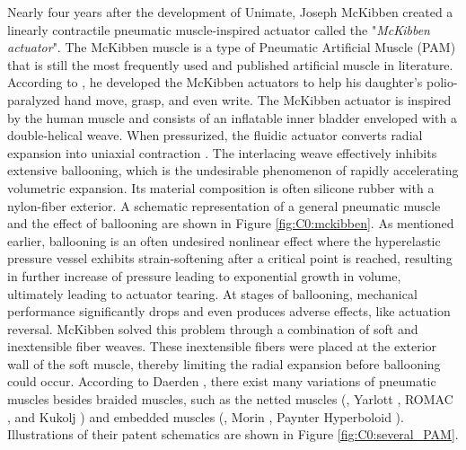 Nearly four years after the development of Unimate, Joseph McKibben created a linearly contractile pneumatic muscle-inspired actuator called the "\emph{McKibben actuator}". The McKibben muscle is a type of Pneumatic Artificial Muscle (PAM) that is still the most frequently used and published artificial muscle in literature. According to \cite{Mckibben}, he developed the McKibben actuators to help his daughter's polio-paralyzed hand move, grasp, and even write. The McKibben actuator is inspired by the human muscle and consists of an inflatable inner bladder enveloped with a double-helical weave. When pressurized, the fluidic actuator converts radial expansion into uniaxial contraction \cite{Daerden1999, Daerden2000, Schulte1961}. The interlacing weave effectively inhibits extensive ballooning, which is the undesirable phenomenon of rapidly accelerating volumetric expansion. Its material composition is often silicone rubber with a nylon-fiber exterior. A schematic representation of a general pneumatic muscle and the effect of ballooning are shown in Figure \ref{fig:C0:mckibben}. As mentioned earlier, ballooning is an often undesired nonlinear effect where the hyperelastic pressure vessel exhibits strain-softening after a critical point is reached, resulting in further increase of pressure leading to exponential growth in volume, ultimately leading to actuator tearing. At stages of ballooning, mechanical performance significantly drops and even produces adverse effects, like actuation reversal. McKibben solved this problem through a combination of soft and inextensible fiber weaves. These inextensible fibers were placed at the exterior wall of the soft muscle, thereby limiting the radial expansion before ballooning could occur. According to Daerden \cite{Daerden1999}, there exist many variations of pneumatic muscles besides braided muscles, such as the netted muscles (\eg, Yarlott \cite{Yarlott1972}, ROMAC \cite{Immega1986}, and Kukolj \cite{Kukolj1988}) and embedded muscles (\eg, Morin \cite{Morin1953}, Paynter Hyperboloid \cite{Paynter1988}). Illustrations of their patent schematics are shown in Figure \ref{fig:C0:several_PAM}.

